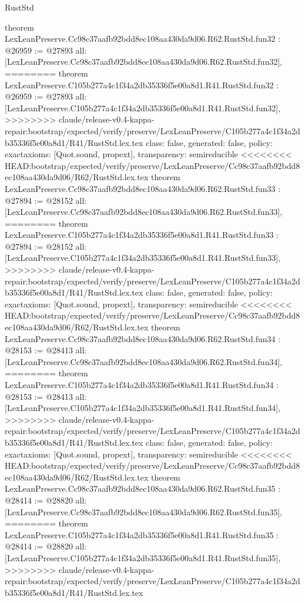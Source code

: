 \begin{lexlean}{RustStd}
\begin{coremodule}
{\begin{coremodule}
{{{{{{{{{{{{{{{{{{{{{{{{{{{{{{{{{{theorem LexLeanPreserve.Cc98c37aafb92bdd8ec108aa430da9d06.R62.RustStd.fun32 : @26959 := @27893 {
  all: [LexLeanPreserve.Cc98c37aafb92bdd8ec108aa430da9d06.R62.RustStd.fun32],
========
theorem LexLeanPreserve.C105b277a4c1f34a2db35336f5e00a8d1.R41.RustStd.fun32 : @26959 := @27893 {
  all: [LexLeanPreserve.C105b277a4c1f34a2db35336f5e00a8d1.R41.RustStd.fun32],
>>>>>>>> claude/release-v0.4-kappa-repair:bootstrap/expected/verify/preserve/LexLeanPreserve/C105b277a4c1f34a2db35336f5e00a8d1/R41/RustStd.lex.tex
  class: false,
  generated: false,
  policy: exact{axioms: [Quot.sound, propext]},
  transparency: semireducible
}
<<<<<<<< HEAD:bootstrap/expected/verify/preserve/LexLeanPreserve/Cc98c37aafb92bdd8ec108aa430da9d06/R62/RustStd.lex.tex
theorem LexLeanPreserve.Cc98c37aafb92bdd8ec108aa430da9d06.R62.RustStd.fun33 : @27894 := @28152 {
  all: [LexLeanPreserve.Cc98c37aafb92bdd8ec108aa430da9d06.R62.RustStd.fun33],
========
theorem LexLeanPreserve.C105b277a4c1f34a2db35336f5e00a8d1.R41.RustStd.fun33 : @27894 := @28152 {
  all: [LexLeanPreserve.C105b277a4c1f34a2db35336f5e00a8d1.R41.RustStd.fun33],
>>>>>>>> claude/release-v0.4-kappa-repair:bootstrap/expected/verify/preserve/LexLeanPreserve/C105b277a4c1f34a2db35336f5e00a8d1/R41/RustStd.lex.tex
  class: false,
  generated: false,
  policy: exact{axioms: [Quot.sound, propext]},
  transparency: semireducible
}
<<<<<<<< HEAD:bootstrap/expected/verify/preserve/LexLeanPreserve/Cc98c37aafb92bdd8ec108aa430da9d06/R62/RustStd.lex.tex
theorem LexLeanPreserve.Cc98c37aafb92bdd8ec108aa430da9d06.R62.RustStd.fun34 : @28153 := @28413 {
  all: [LexLeanPreserve.Cc98c37aafb92bdd8ec108aa430da9d06.R62.RustStd.fun34],
========
theorem LexLeanPreserve.C105b277a4c1f34a2db35336f5e00a8d1.R41.RustStd.fun34 : @28153 := @28413 {
  all: [LexLeanPreserve.C105b277a4c1f34a2db35336f5e00a8d1.R41.RustStd.fun34],
>>>>>>>> claude/release-v0.4-kappa-repair:bootstrap/expected/verify/preserve/LexLeanPreserve/C105b277a4c1f34a2db35336f5e00a8d1/R41/RustStd.lex.tex
  class: false,
  generated: false,
  policy: exact{axioms: [Quot.sound, propext]},
  transparency: semireducible
}
<<<<<<<< HEAD:bootstrap/expected/verify/preserve/LexLeanPreserve/Cc98c37aafb92bdd8ec108aa430da9d06/R62/RustStd.lex.tex
theorem LexLeanPreserve.Cc98c37aafb92bdd8ec108aa430da9d06.R62.RustStd.fun35 : @28414 := @28820 {
  all: [LexLeanPreserve.Cc98c37aafb92bdd8ec108aa430da9d06.R62.RustStd.fun35],
========
theorem LexLeanPreserve.C105b277a4c1f34a2db35336f5e00a8d1.R41.RustStd.fun35 : @28414 := @28820 {
  all: [LexLeanPreserve.C105b277a4c1f34a2db35336f5e00a8d1.R41.RustStd.fun35],
>>>>>>>> claude/release-v0.4-kappa-repair:bootstrap/expected/verify/preserve/LexLeanPreserve/C105b277a4c1f34a2db35336f5e00a8d1/R41/RustStd.lex.tex
}}}}}}}}}}}}}}}}}}}}}}}}}}}}}}}}}}}}}}}
\end{coremodule}}
\end{coremodule}
\end{lexlean}
